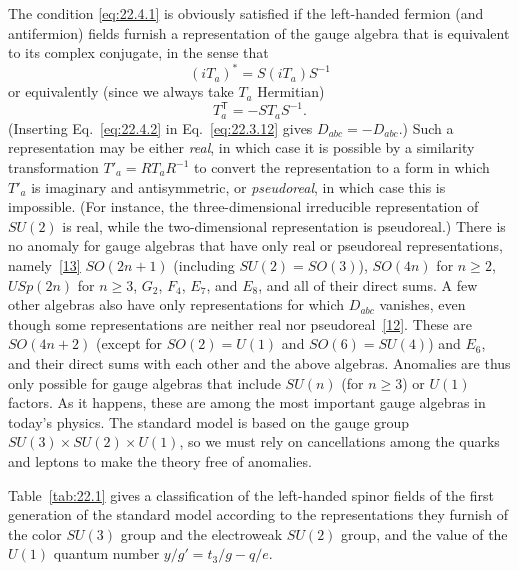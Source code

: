The condition \eqref{eq:22.4.1} is obviously satisfied if the left-handed
fermion (and antifermion) fields furnish a representation of the gauge
algebra that is equivalent to its complex conjugate, in the sense that
\[
 (iT_a)^*=S(iT_a)S^{-1}
\]
or equivalently (since we always take $T_a$ Hermitian)
\begin{equation}
 T_a^{\mathsf T}=-S T_a S^{-1}.
 \tag{22.4.2}\label{eq:22.4.2}
\end{equation}
(Inserting Eq.~\eqref{eq:22.4.2} in Eq.~\eqref{eq:22.3.12} gives
$D_{abc}=-D_{abc}$.) Such a representation
may be either \emph{real}, in which case it is possible by a similarity
transformation $T'_a=R T_a R^{-1}$ to convert the representation
to a form in which $T'_a$ is imaginary and antisymmetric, or
\emph{pseudoreal}, in which case this is impossible. (For instance, the
three-dimensional irreducible representation of $SU(2)$ is real, while
the two-dimensional representation is pseudoreal.) There is no anomaly
for gauge algebras that have only real or pseudoreal representations,
namely~\hyperref[ch22-ref-13]{[13]} $SO(2n+1)$ (including
$SU(2)=SO(3)$), $SO(4n)$ for $n\geq2$, $USp(2n)$ for $n\geq3$,
$G_2$, $F_4$, $E_7$, and $E_8$, and all of their direct sums. A few other
algebras also have only representations for which
$D_{abc}$ vanishes, even though some representations are
neither real nor pseudoreal~\hyperref[ch22-ref-12]{[12]}. These are
$SO(4n+2)$ (except for $SO(2)=U(1)$ and $SO(6)=SU(4)$) and $E_6$, and
their direct sums with each other and the above algebras. Anomalies are
thus only possible for gauge algebras that include $SU(n)$ (for $n\geq3$)
or $U(1)$ factors. As it happens, these are among the most important gauge
algebras in today's physics. The standard model is based on the gauge
group $SU(3)\times SU(2)\times U(1)$, so we must rely on cancellations among
the quarks and leptons to make the theory free of anomalies.

Table~\ref{tab:22.1} gives a classification of the left-handed spinor fields
of the first generation of the standard model according to the
representations they furnish of the color $SU(3)$ group and the electroweak
$SU(2)$ group, and the value of the $U(1)$ quantum number
$y/g'=t_3/g-q/e$.

